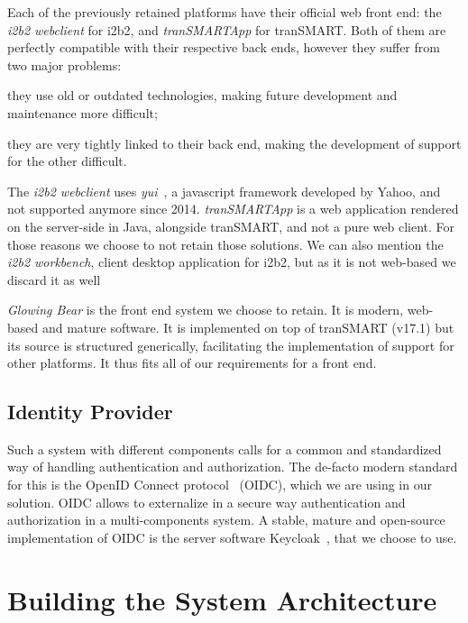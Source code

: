 Each of the previously retained platforms have their official web front end: the \emph{i2b2 webclient} for i2b2, and \emph{tranSMARTApp} for tranSMART.
Both of them are perfectly compatible with their respective back ends, however they suffer from two major problems:
\begin{enumerate*}
    \item they use old or outdated technologies, making future development and maintenance more difficult;
    \item they are very tightly linked to their back end, making the development of support for the other difficult.
\end{enumerate*}
The \emph{i2b2 webclient} uses \emph{yui}~\cite{todo}, a javascript framework developed by Yahoo, and not supported anymore since 2014. 
\emph{tranSMARTApp} is a web application rendered on the server-side in Java, alongside tranSMART, and not a pure web client.
For those reasons we choose to not retain those solutions.
We can also mention the \emph{i2b2 workbench}, client desktop application for i2b2, but as it is not web-based we discard it as well

\emph{Glowing Bear} is the front end system we choose to retain.
It is modern, web-based and mature software. 
It is implemented on top of tranSMART (v17.1) but its source is structured generically, facilitating the implementation of support for other platforms.
It thus fits all of our requirements for a front end.


\subsection{Identity Provider}

Such a system with different components calls for a common and standardized way of handling authentication and authorization.
The de-facto modern standard for this is the OpenID Connect protocol~\cite{todo} (OIDC), which we are using in our solution.
OIDC allows to externalize in a secure way authentication and authorization in a multi-components system.
A stable, mature and open-source implementation of OIDC is the server software Keycloak~\cite{todo}, that we choose to use.


\section{Building the System Architecture}

